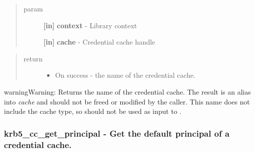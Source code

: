 \documentclass[letterpaper,10pt,english]{sphinxmanual}
\begin{document}
\begin{quote}\begin{description}
\item[{param}] \leavevmode
\textbf{{[}in{]}} \textbf{context} - Library context

\textbf{{[}in{]}} \textbf{cache} - Credential cache handle

\end{description}\end{quote}
\begin{quote}\begin{description}
\item[{return}] \leavevmode\begin{itemize}
\item {} 
On success - the name of the credential cache.

\end{itemize}

\end{description}\end{quote}

\begin{notice}{warning}{Warning:}
Returns the name of the credential cache. The result is an alias into \emph{cache} and should not be freed or modified by the caller. This name does not include the cache type, so should not be used as input to {\hyperref[appdev/refs/api/krb5_cc_resolve:c.krb5_cc_resolve]{}} .
\end{notice}


\subsubsection{krb5\_cc\_get\_principal -  Get the default principal of a credential cache.}
\label{appdev/refs/api/krb5_cc_get_principal:krb5-cc-get-principal-get-the-default-principal-of-a-credential-cache}\label{appdev/refs/api/krb5_cc_get_principal::doc}

\begin{fulllineitems}
\label{appdev/refs/api/krb5_cc_get_principal:c.krb5_cc_get_principal}
\end{fulllineitems}
\end{document}
